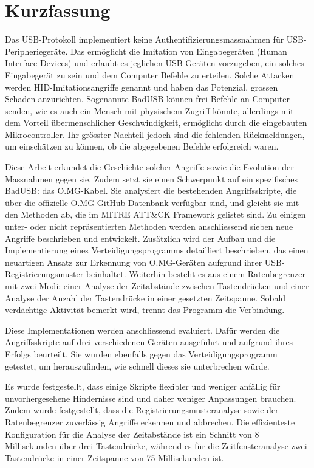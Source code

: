 
\chapter*{Kurzfassung}

Das USB-Protokoll implementiert keine Authentifizierungsmassnahmen f\"ur USB-Peripherieger\"ate. Das erm\"oglicht die Imitation von Eingabeger\"aten (Human Interface Devices) und erlaubt es jeglichen USB-Ger\"aten vorzugeben, ein solches Eingabeger\"at zu sein und dem Computer Befehle zu erteilen. Solche Attacken werden HID-Imitationsangriffe genannt und haben das Potenzial, grossen Schaden anzurichten. Sogenannte BadUSB k\"onnen frei Befehle an Computer senden, wie es auch ein Mensch mit physischem Zugriff k\"onnte, allerdings mit dem Vorteil \"ubermenschlicher Geschwindigkeit, erm\"oglicht durch die eingebauten Mikrocontroller. Ihr gr\"osster Nachteil jedoch sind die fehlenden R\"uckmeldungen, um einsch\"atzen zu k\"onnen, ob die abgegebenen Befehle erfolgreich waren.

Diese Arbeit erkundet die Geschichte solcher Angriffe sowie die Evolution der Massnahmen gegen sie. Zudem setzt sie einen Schwerpunkt auf ein spezifisches BadUSB: das O.MG-Kabel. Sie analysiert die bestehenden Angriffsskripte, die \"uber die offizielle O.MG GitHub-Datenbank verf\"ugbar sind, und gleicht sie mit den Methoden ab, die im MITRE ATT\&CK Framework gelistet sind. Zu einigen unter- oder nicht repr\"asentierten Methoden werden anschliessend sieben neue Angriffe beschrieben und entwickelt. Zus\"atzlich wird der Aufbau und die Implementierung eines Verteidigungsprogramms detailliert beschrieben, das einen neuartigen Ansatz zur Erkennung von O.MG-Ger\"aten aufgrund ihrer USB-Registrierungsmuster beinhaltet. Weiterhin besteht es aus einem Ratenbegrenzer mit zwei Modi: einer Analyse der Zeitabst\"ande zwischen Tastendr\"ucken und einer Analyse der Anzahl der Tastendr\"ucke in einer gesetzten Zeitspanne. Sobald verd\"achtige Aktivit\"at bemerkt wird, trennt das Programm die Verbindung.

Diese Implementationen werden anschliessend evaluiert. Daf\"ur werden die Angriffsskripte auf drei verschiedenen Ger\"aten ausgef\"uhrt und aufgrund ihres Erfolgs beurteilt. Sie wurden ebenfalls gegen das Verteidigungsprogramm getestet, um herauszufinden, wie schnell dieses sie unterbrechen w\"urde.

Es wurde festgestellt, dass einige Skripte flexibler und weniger anf\"allig f\"ur unvorhergesehene Hindernisse sind und daher weniger Anpassungen brauchen. Zudem wurde festgestellt, dass die Registrierungsmusteranalyse sowie der Ratenbegrenzer zuverl\"assig Angriffe erkennen und abbrechen. Die effizienteste Konfiguration f\"ur die Analyse der Zeitabst\"ande ist ein Schnitt von 8 Millisekunden \"uber drei Tastendr\"ucke, w\"ahrend es f\"ur die Zeitfensteranalyse zwei Tastendr\"ucke in einer Zeitspanne von 75 Millisekunden ist.

